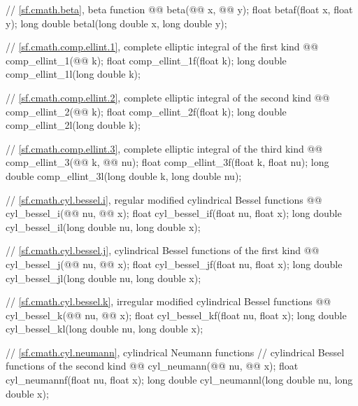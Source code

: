 \begin{codeblock}
{  // \ref{sf.cmath.beta}, beta function
  @@ beta(@@ x, @@ y);
  float               betaf(float x, float y);
  long double         betal(long double x, long double y);

  // \ref{sf.cmath.comp.ellint.1}, complete elliptic integral of the first kind
  @@ comp_ellint_1(@@ k);
  float               comp_ellint_1f(float k);
  long double         comp_ellint_1l(long double k);

  // \ref{sf.cmath.comp.ellint.2}, complete elliptic integral of the second kind
  @@ comp_ellint_2(@@ k);
  float               comp_ellint_2f(float k);
  long double         comp_ellint_2l(long double k);

  // \ref{sf.cmath.comp.ellint.3}, complete elliptic integral of the third kind
  @@ comp_ellint_3(@@ k, @@ nu);
  float               comp_ellint_3f(float k, float nu);
  long double         comp_ellint_3l(long double k, long double nu);

  // \ref{sf.cmath.cyl.bessel.i}, regular modified cylindrical Bessel functions
  @@ cyl_bessel_i(@@ nu, @@ x);
  float               cyl_bessel_if(float nu, float x);
  long double         cyl_bessel_il(long double nu, long double x);

  // \ref{sf.cmath.cyl.bessel.j}, cylindrical Bessel functions of the first kind
  @@ cyl_bessel_j(@@ nu, @@ x);
  float               cyl_bessel_jf(float nu, float x);
  long double         cyl_bessel_jl(long double nu, long double x);

  // \ref{sf.cmath.cyl.bessel.k}, irregular modified cylindrical Bessel functions
  @@ cyl_bessel_k(@@ nu, @@ x);
  float               cyl_bessel_kf(float nu, float x);
  long double         cyl_bessel_kl(long double nu, long double x);

  // \ref{sf.cmath.cyl.neumann}, cylindrical Neumann functions
  // cylindrical Bessel functions of the second kind
  @@ cyl_neumann(@@ nu, @@ x);
  float               cyl_neumannf(float nu, float x);
  long double         cyl_neumannl(long double nu, long double x);

}
\end{codeblock}
